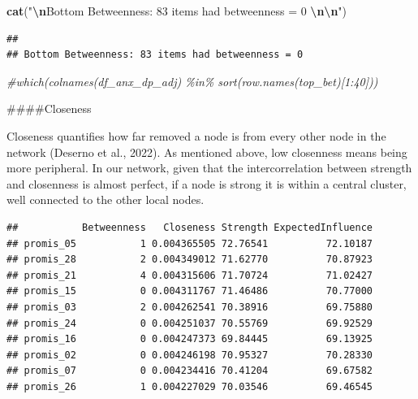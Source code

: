 \documentclass[
]{article}
\newenvironment{Shaded}{\begin{snugshade}}{\end{snugshade}}
\newcommand{\CommentTok}[1]{\textcolor[rgb]{0.56,0.35,0.01}{\textit{#1}}}
\newcommand{\DecValTok}[1]{\textcolor[rgb]{0.00,0.00,0.81}{#1}}
\newcommand{\FunctionTok}[1]{\textcolor[rgb]{0.13,0.29,0.53}{\textbf{#1}}}
\newcommand{\NormalTok}[1]{#1}
\newcommand{\OtherTok}[1]{\textcolor[rgb]{0.56,0.35,0.01}{#1}}
\newcommand{\SpecialCharTok}[1]{\textcolor[rgb]{0.81,0.36,0.00}{\textbf{#1}}}
\newcommand{\StringTok}[1]{\textcolor[rgb]{0.31,0.60,0.02}{#1}}
\begin{document}
\begin{Shaded}
\begin{Highlighting}[]
\FunctionTok{cat}\NormalTok{(}\StringTok{"}\SpecialCharTok{\textbackslash{}n}\StringTok{Bottom Betweenness: 83 items had betweenness = 0 }\SpecialCharTok{\textbackslash{}n\textbackslash{}n}\StringTok{"}\NormalTok{)}
\end{Highlighting}
\end{Shaded}

\begin{verbatim}
## 
## Bottom Betweenness: 83 items had betweenness = 0
\end{verbatim}

\begin{Shaded}
\begin{Highlighting}[]
\CommentTok{\#which(colnames(df\_anx\_dp\_adj) \%in\% sort(row.names(top\_bet)[1:40]))}
\end{Highlighting}
\end{Shaded}

\#\#\#\#Closeness

Closeness quantifies how far removed a node is from every other node in
the network (Deserno et al., 2022). As mentioned above, low closenness
means being more peripheral. In our network, given that the
intercorrelation between strength and closenness is almost perfect, if a
node is strong it is within a central cluster, well connected to the
other local nodes.

\begin{Shaded}
\end{Shaded}

\begin{verbatim}
##           Betweenness   Closeness Strength ExpectedInfluence
## promis_05           1 0.004365505 72.76541          72.10187
## promis_28           2 0.004349012 71.62770          70.87923
## promis_21           4 0.004315606 71.70724          71.02427
## promis_15           0 0.004311767 71.46486          70.77000
## promis_03           2 0.004262541 70.38916          69.75880
## promis_24           0 0.004251037 70.55769          69.92529
## promis_16           0 0.004247373 69.84445          69.13925
## promis_02           0 0.004246198 70.95327          70.28330
## promis_07           0 0.004234416 70.41204          69.67582
## promis_26           1 0.004227029 70.03546          69.46545
\end{verbatim}
\end{document}
